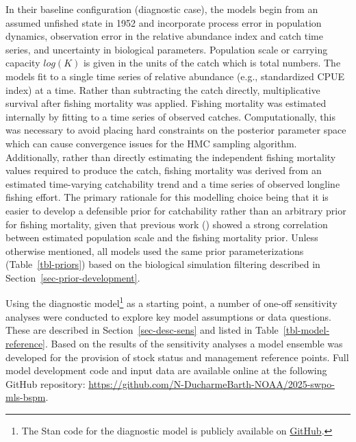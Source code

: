\documentclass[
  11pt,
]{SCreport}
\begin{document}
In their baseline configuration (diagnostic case), the models begin from
an assumed unfished state in 1952 and incorporate process error in
population dynamics, observation error in the relative abundance index
and catch time series, and uncertainty in biological parameters.
Population scale or carrying capacity \(log(K)\) is given in the units
of the catch which is total numbers. The models fit to a single time
series of relative abundance (e.g., standardized CPUE index) at a time.
Rather than subtracting the catch directly, multiplicative survival
after fishing mortality was applied. Fishing mortality was estimated
internally by fitting to a time series of observed catches.
Computationally, this was necessary to avoid placing hard constraints on
the posterior parameter space which can cause convergence issues for the
HMC sampling algorithm. Additionally, rather than directly estimating
the independent fishing mortality values required to produce the catch,
fishing mortality was derived from an estimated time-varying
catchability trend and a time series of observed longline fishing
effort. The primary rationale for this modelling choice being that it is
easier to develop a defensible prior for catchability rather than an
arbitrary prior for fishing mortality, given that previous work
() showed a strong correlation
between estimated population scale and the fishing mortality prior.
Unless otherwise mentioned, all models used the same prior
parameterizations (Table~\ref{tbl-priors}) based on the biological
simulation filtering described in Section~\ref{sec-prior-development}.

Using the diagnostic model\footnote{The Stan code for the diagnostic
  model
  is publicly available on
  \href{https://github.com/N-DucharmeBarth-NOAA/2025-swpo-mls-bspm/blob/main/code/Stan/bspm_estqsimple_softdep_fullmvprior_x0_sttgamma_flexsigmaC_OPT.stan}{GitHub}.}
as a starting point, a number of one-off sensitivity analyses were
conducted to explore key model assumptions or data questions. These are
described in Section~\ref{sec-desc-sens} and listed in
Table~\ref{tbl-model-reference}. Based on the results of the sensitivity
analyses a model ensemble was developed for the provision of stock
status and management reference points. Full model development code and
input data are available online at the following GitHub repository:
\url{https://github.com/N-DucharmeBarth-NOAA/2025-swpo-mls-bspm}.
\end{document}
